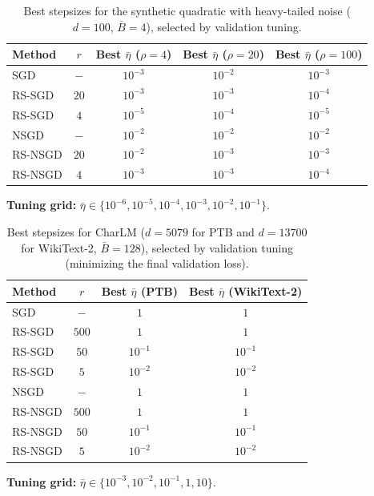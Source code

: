\documentclass[10pt]{article}
\begin{document}
\begin{table}[t]
\centering
\caption{Best stepsizes for the synthetic quadratic with heavy-tailed noise ($d=100$, $\bar{B}=4$), selected by validation tuning.}
\small
\begin{tabular}{l c c c c}
\toprule
Method & $r$ & Best $\bar{\eta}$ ($\rho=4$) & Best $\bar{\eta}$ ($\rho=20$) & Best $\bar{\eta}$ ($\rho=100$) \\
\midrule
SGD      & $-$  & $10^{-3}$ & $10^{-2}$ & $10^{-3}$ \\
RS-SGD   & $20$ & $10^{-3}$ & $10^{-3}$ & $10^{-4}$ \\
RS-SGD   & $4$  & $10^{-5}$ & $10^{-4}$ & $10^{-5}$ \\
\midrule
NSGD     & $-$  & $10^{-2}$ & $10^{-2}$ & $10^{-2}$ \\
RS-NSGD  & $20$ & $10^{-2}$ & $10^{-3}$ & $10^{-3}$ \\
RS-NSGD  & $4$  & $10^{-3}$ & $10^{-3}$ & $10^{-4}$ \\
\bottomrule
\end{tabular}


\begin{minipage}{0.98\linewidth}
\centering
\textbf{Tuning grid: }
$\bar{\eta} \in \{10^{-6},10^{-5},10^{-4},10^{-3},10^{-2},10^{-1}\}$.
\end{minipage}

\label{tab:bestlr-quad-horiz}
\end{table}
\begin{table}[t]
\centering
\caption{Best stepsizes for CharLM ($d=5079$ for PTB and $d=13700$ for WikiText-2, $\bar{B}=128$), selected by validation tuning (minimizing the final validation loss).}
\small
\begin{tabular}{l c c c}
\toprule
Method & $r$ & Best $\bar{\eta}$ (PTB) & Best $\bar{\eta}$ (WikiText-2) \\
\midrule
SGD      & $-$   & $1$        & $1$ \\
RS-SGD   & $500$ & $1$        & $1$ \\
RS-SGD   & $50$  & $10^{-1}$  & $10^{-1}$ \\
RS-SGD   & $5$   & $10^{-2}$  & $10^{-2}$ \\
\midrule
NSGD     & $-$   & $1$        & $1$ \\
RS-NSGD  & $500$ & $1$        & $1$ \\
RS-NSGD  & $50$  & $10^{-1}$  & $10^{-1}$ \\
RS-NSGD  & $5$   & $10^{-2}$  & $10^{-2}$ \\
\bottomrule
\end{tabular}


\begin{minipage}{0.98\linewidth}
\centering
\textbf{Tuning grid: }
$\bar{\eta} \in \{10^{-3},10^{-2},10^{-1},1,10\}$.
\end{minipage}


\label{tab:bestlr-charlm-horiz}
\end{table}
\end{document}
